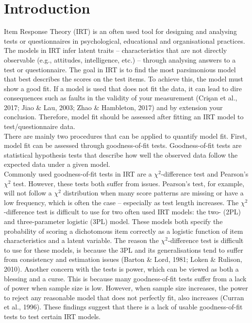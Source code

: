\documentclass[Royal,sageapa,times,doublespace]{sagej}
\begin{document}

\maketitle

\section{Introduction}
Item Response Theory (IRT) is an often used tool for designing and analysing tests or questionnaires in psychological, educational and organisational practices. The models in IRT infer latent traits -- characteristics that are not directly observable (e.g., attitudes, intelligence, etc.) -- through analysing answers to a test or questionnaire. The goal in IRT is to find the most parsimonious model that best describes the scores on the test items. To achieve this, the model must show a good fit. If a model is used that does not fit the data, it can lead to dire consequences such as faults in the validity of your measurement (Cri\c{s}an et al., 2017; Jiao \& Lau, 2003; Zhao \& Hambleton, 2017) and by extension your conclusion. Therefore, model fit should be assessed after fitting an IRT model to test/questionnaire data. \\
\indent There are mainly two procedures that can be applied to quantify model fit. First, model fit can be assessed through goodness-of-fit tests. Goodness-of-fit tests are statistical hypothesis tests that describe how well the observed data follow the expected data under a given model. \\
\indent Commonly used goodness-of-fit tests in IRT are a $\chi^2$-difference test and Pearson's $\chi^2$ test. However, these tests both suffer from issues. Pearson's test, for example, will not follow a $\chi^2$ distribution when many score patterns are missing or have a low frequency, which is often the case -- especially as test length increases. The $\chi^2$-difference test is difficult to use for two often used IRT models: the two- (2PL) and three-parameter logistic (3PL) model. These models both specify the probability of scoring a dichotomous item correctly as a logistic function of item characteristics and a latent variable. The reason the $\chi^2$-difference test is difficult to use for these models, is because the 3PL and its generalisations tend to suffer from consistency and estimation issues (Barton \& Lord, 1981; Loken \& Rulison, 2010). Another concern with the tests is power, which can be viewed as both a blessing and a curse. This is because many goodness-of-fit tests suffer from a lack of power when sample size is low. However, when sample size increases, the power to reject any reasonable model that does not perfectly fit, also increases (Curran et al., 1996). These findings suggest that there is a lack of usable goodness-of-fit tests to test certain IRT models. \\
\end{document}
